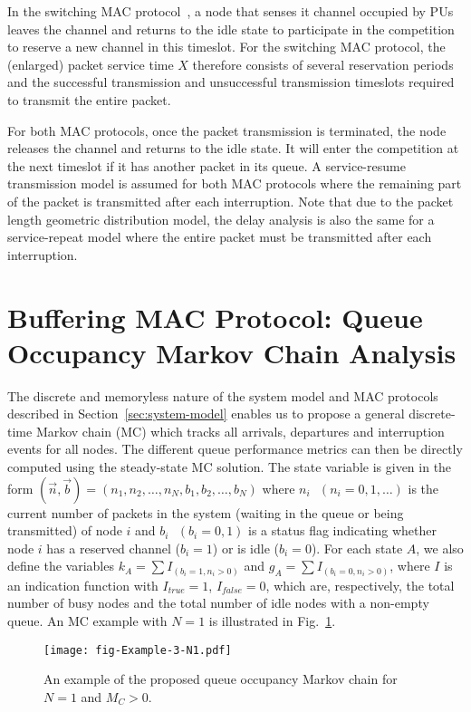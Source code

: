 \documentclass[12pt,journal,oneside,onecolumn]{IEEEtran}
\begin{document}
In the switching MAC protocol~\cite{park11}, a node that senses it channel occupied by PUs leaves the channel and returns to the idle state to participate in the competition to reserve a new channel in this timeslot. For the switching MAC protocol, the (enlarged) packet service time $X$ therefore consists of several reservation periods and the successful transmission and unsuccessful transmission timeslots required to transmit the entire packet.

 For both MAC protocols, once the packet transmission is terminated, the node releases the channel and returns to the idle state. It will enter the competition at the next timeslot if it has another packet in its queue. A service-resume transmission model is assumed for both MAC protocols where the remaining part of the packet is transmitted after each interruption. Note that due to the packet length geometric distribution model, the delay analysis is also the same for a service-repeat model where the entire packet must be transmitted after each interruption.
 

\section{Buffering MAC Protocol: Queue Occupancy Markov Chain Analysis}
\label{sec:Queue-Occupancy}
The discrete and memoryless nature of the system model and MAC protocols described in Section~\ref{sec:system-model} 
enables us to propose a general discrete-time Markov chain (MC) which tracks all arrivals, departures and 
interruption events for all nodes. The different queue performance metrics can then be directly computed using the 
steady-state MC solution.  The state variable is given in the form $(\vec{n},\vec{b})=(n_1,n_2,\dots,n_N,b_1,b_2,\dots,b_N)$ 
where $n_i \mbox { } (n_i=0,1,\dots)$ is the current number of packets in the system (waiting in the queue or being transmitted) 
of node $i$  and $b_i \mbox{ } (b_i=0,1)$ is a status flag indicating whether node $i$ has a reserved channel ($b_i=1$) or is 
idle ($b_i=0$). For each state $A$, we also define the variables $k_A=\sum{I_{(b_i=1, n_i>0)}}$ and $g_A=\sum{I_{(b_i=0, n_i>0)}}$, 
where $I$ is an indication function with $I_{true}=1$, $I_{false}=0$, which are, respectively, the total number of busy 
nodes and the total number of idle nodes with a non-empty queue. An MC example with $N=1$ is illustrated in Fig.~\ref{fig-Example-3-N1.pdf}. 
\begin{figure}\texttt{[image: fig-Example-3-N1.pdf]}\caption{An example of the proposed queue occupancy Markov chain for $N=1$ and $M_C>0$.}\label{fig-Example-3-N1.pdf}\end{figure}
\end{document}
